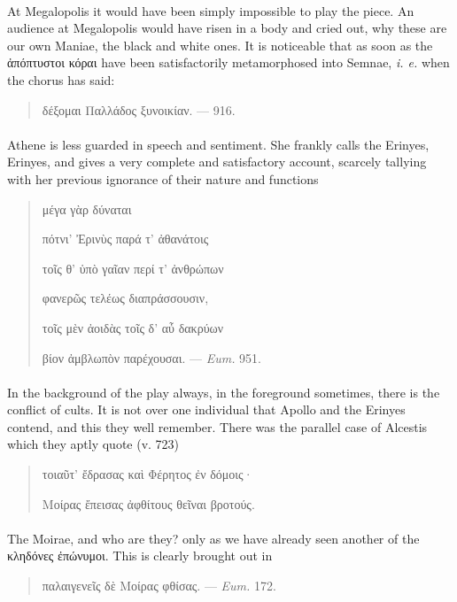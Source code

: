 \documentclass[a4paper, 11pt, oneside, polutonikogreek, english]{article}
\begin{document}
\paragraph{}
At Megalopolis it would have been simply impossible to play the piece. An audience at Megalopolis would have risen in a body and cried out, why these are our own Maniae, the black and white ones. It is noticeable that as soon as the ἀπόπτυστοι κόραι have been satisfactorily metamorphosed into Semnae, \emph{i. e.} when the chorus has said:
\begin{quotation}
\large
δέξομαι Παλλάδος ξυνοικίαν. --- 916.
\end{quotation}
\paragraph{}
Athene is less guarded in speech and sentiment. She frankly calls the Erinyes, Erinyes, and gives a very complete and satisfactory account, scarcely tallying with her previous ignorance of their nature and functions
\begin{quotation}
\large
\hspace*{20mm}μέγα γὰρ δύναται

πότνι' Ἐρινὺς παρά τ' ἀθανάτοις

τοῖς θ' ὑπὸ γαῖαν περί τ' ἀνθρώπων

φανερῶς τελέως διαπράσσουσιν,

τοῖς μὲν ἀοιδὰς τοῖς δ' αὖ δακρύων

βίον ἀμβλωπὸν παρέχουσαι. --- \emph{Eum.} 951.
\end{quotation}
\paragraph{}
In the background of the play always, in the foreground sometimes, there is the conflict of cults. It is not over one individual that Apollo and the Erinyes contend, and this they well remember. There was the parallel case of Alcestis which they aptly quote (v. 723)
\begin{quotation}
\large
τοιαῦτ' ἔδρασας καὶ Φέρητος ἐν δόμοις·

Μοίρας ἔπεισας ἀφθίτους θεῖναι βροτούς.
\end{quotation}
\paragraph{}
The Moirae, and who are they? only as we have already seen another of the κληδόνες ἐπώνυμοι. This is clearly brought out in
\begin{quotation}
\large
παλαιγενεῖς δὲ Μοίρας φθίσας. --- \emph{Eum.} 172.
\end{quotation}
\end{document}
